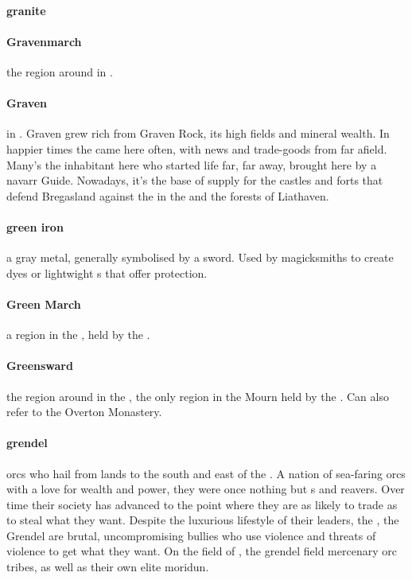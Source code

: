 \paragraph{granite} 
\paragraph{Gravenmarch} the region around  in .
\paragraph{Graven}  in . Graven grew rich from Graven Rock, its high fields and mineral wealth. In happier times the  came here often, with news and trade-goods from far afield. Many's the inhabitant here who started life far, far away, brought here by a navarr Guide. Nowadays, it’s the base of supply for the castles and forts that defend Bregasland against the  in the  and the forests of Liathaven.
\paragraph{green iron} a gray metal, generally symbolised by a sword. Used by magicksmiths to create dyes or lightwight s that offer protection.
\paragraph{Green March} a region in the , held by the .
\paragraph{Greensward} the region around  in the , the only region in the Mourn held by the . Can also refer to the Overton Monastery.
\paragraph{grendel} orcs who hail from lands to the south and east of the . A nation of sea-faring orcs with a love for wealth and power, they were once nothing but s and reavers. Over time their society has advanced to the point where they are as likely to trade as to steal what they want. Despite the luxurious lifestyle of their leaders, the , the Grendel are brutal, uncompromising bullies who use violence and threats of violence to get what they want. On the field of , the grendel field mercenary orc tribes, as well as their own elite moridun.
